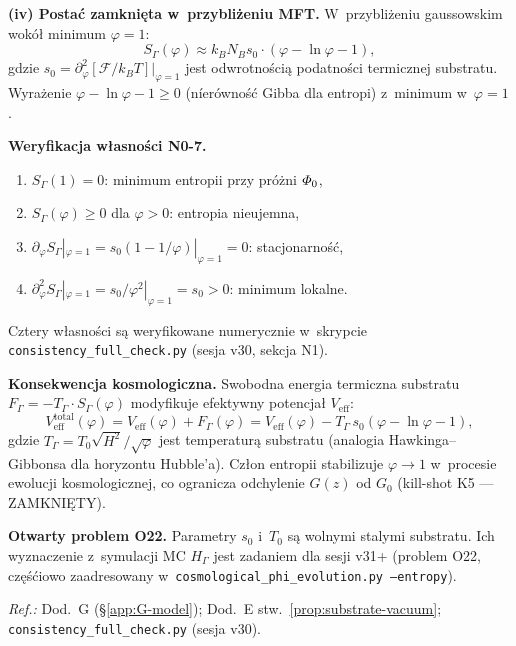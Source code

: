 \begin{chain}
\textbf{(iv) Posta\'c zamkni\k{e}ta w~przybli\.zeniu MFT.}
W~przybli\.zeniu gaussowskim wok\'o\l{} minimum $\varphi = 1$:
\begin{equation}\label{eq:S-mft-gauss}
  S_\Gamma(\varphi)
  \approx k_B N_B s_0 \cdot (\varphi - \ln\varphi - 1),
\end{equation}
gdzie $s_0 = \partial^2_\varphi[\mathcal{F}/k_BT]|_{\varphi=1}$
jest odwrotno\'sci\k{a} podatno\'sci termicznej substratu.
Wyra\.zenie $\varphi - \ln\varphi - 1 \geq 0$ (n\'ier\'owno\'s\'c
Gibba dla entropi) z~minimum w~$\varphi = 1$.

\medskip\noindent\textbf{Weryfikacja w\l{}asno\'sci N0-7.}
\begin{enumerate}[nosep,label=(\alph*)]
  \item $S_\Gamma(1) = 0$: minimum entropii przy pr\'o\.zni $\varPhi_0$,
  \item $S_\Gamma(\varphi) \geq 0$ dla $\varphi > 0$: entropia nieujemna,
  \item $\partial_\varphi S_\Gamma|_{\varphi=1} = s_0(1-1/\varphi)|_{\varphi=1} = 0$:
        stacjonarno\'s\'c,
  \item $\partial^2_\varphi S_\Gamma|_{\varphi=1} = s_0/\varphi^2|_{\varphi=1} = s_0 > 0$:
        minimum lokalne.
\end{enumerate}
Cztery w\l{}asno\'sci s\k{a} weryfikowane numerycznie w~skrypcie
\texttt{consistency\_full\_check.py} (sesja v30, sekcja N1).

\medskip\noindent\textbf{Konsekwencja kosmologiczna.}
Swobodna energia termiczna substratu
$F_\Gamma = -T_\Gamma \cdot S_\Gamma(\varphi)$
modyfikuje efektywny potencja\l{} $V_{\mathrm{eff}}$:
\begin{equation}\label{eq:Veff-with-entropy}
  V_{\mathrm{eff}}^{\mathrm{total}}(\varphi)
  = V_{\mathrm{eff}}(\varphi) + F_\Gamma(\varphi)
  = V_{\mathrm{eff}}(\varphi) - T_\Gamma\,s_0(\varphi - \ln\varphi - 1),
\end{equation}
gdzie $T_\Gamma = T_0\sqrt{H^2}/\sqrt{\varphi}$ jest temperatur\k{a}
substratu (analogia Hawkinga--Gibbonsa dla horyzontu Hubble'a).
Cz\l{}on entropii stabilizuje $\varphi \to 1$ w~procesie ewolucji
kosmologicznej, co ogranicza odchylenie $G(z)$ od $G_0$
(kill-shot K5 --- ZAMKNI\k{E}TY).

\medskip\noindent\textbf{Otwarty problem O22.}
Parametry $s_0$ i~$T_0$ s\k{a} wolnymi stalymi substratu.
Ich wyznaczenie z~symulacji MC $H_\Gamma$ jest zadaniem
dla sesji v31+ (problem O22, cz\k{e}\'s\'ciowo zaadresowany
w~\texttt{cosmological\_phi\_evolution.py --entropy}).

\emph{Ref.:} Dod.~G (\S\ref{app:G-model}); Dod.~E stw.~\ref{prop:substrate-vacuum};
\texttt{consistency\_full\_check.py} (sesja v30).
\end{chain}

